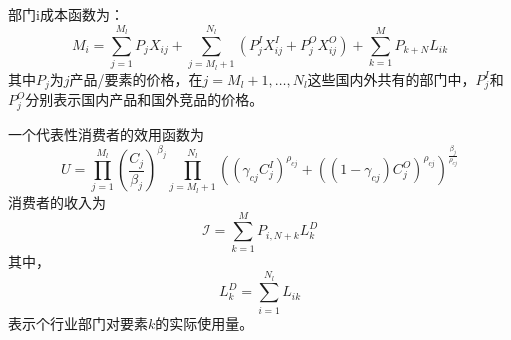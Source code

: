 \documentclass{article}
\begin{document}
部门i成本函数为：
\begin{equation}
    M_i=\sum_{j=1}^{M_l} P_jX_{ij}+\sum_{j=M_l+1}^{N_l} (P_j^IX^I_{ij}+P_j^OX_{ij}^O)+\sum_{k=1}^M P_{k+N}L_{ik}
\end{equation} 其中$P_j$为$j$产品/要素的价格，在$j=M_l+1,\dots,N_l$这些国内外共有的部门中，$P_j^I$和$P_j^O$分别表示国内产品和国外竞品的价格。

一个代表性消费者的效用函数为
\begin{equation}
    U=\prod_{j=1}^{M_l} \left(\frac{C_j}{\beta_j}\right)^{\beta_j}\prod_{j=M_l+1}^{N_l}\left((\gamma_{cj}C_j^I)^{\rho_{cj}}+((1-\gamma_{cj})C_j^O)^{\rho_{cj}}\right)^{\frac{\beta_j}{\rho_{cj}}}
\end{equation}
消费者的收入为
\begin{equation}\label{income}
    \mathcal{I}=\sum_{k=1}^MP_{i,N+k}L_k^D
\end{equation} 其中，
\begin{equation}
    L_k^D=\sum_{i=1}^{N_l}L_{ik}
\end{equation} 表示个行业部门对要素$k$的实际使用量。
\end{document}
